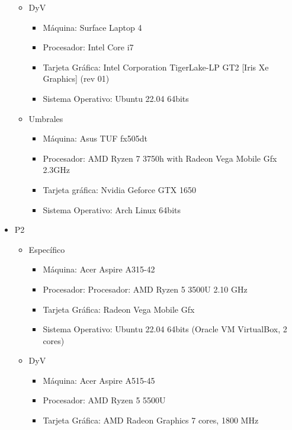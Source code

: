 \documentclass{article}
\begin{document}
\begin{itemize}
\begin{itemize}
\begin{itemize}
            \end{itemize}
            \item DyV \begin{itemize}
                \item Máquina: Surface Laptop 4
                \item Procesador: Intel Core i7
                \item Tarjeta Gráfica: Intel Corporation TigerLake-LP GT2 [Iris Xe Graphics] (rev 01)
                \item Sistema Operativo: Ubuntu 22.04 64bits
            \end{itemize}
                \item Umbrales\begin{itemize}
                    \item Máquina: Asus TUF fx505dt
                    \item Procesador: AMD Ryzen 7 3750h with Radeon Vega Mobile Gfx 2.3GHz
                    \item Tarjeta gráfica: Nvidia Geforce GTX 1650
                    \item Sistema Operativo: Arch Linux 64bits 
            \end{itemize}
        \end{itemize}
        \item P2
        \begin{itemize}
            \item Específico\begin{itemize}
                \item Máquina: Acer Aspire A315-42
                \item Procesador: Procesador: AMD Ryzen 5 3500U 2.10 GHz
                \item Tarjeta Gráfica: Radeon Vega Mobile Gfx
                \item Sistema Operativo: Ubuntu 22.04 64bits (Oracle VM VirtualBox, 2 cores)
            \end{itemize}
            \item DyV\begin{itemize}
                \item Máquina: Acer Aspire A515-45
                \item Procesador: AMD Ryzen 5 5500U 
                \item Tarjeta Gráfica: AMD Radeon Graphics 7 cores, 1800 MHz



\end{itemize}
\end{itemize}
\end{itemize}
\end{document}
